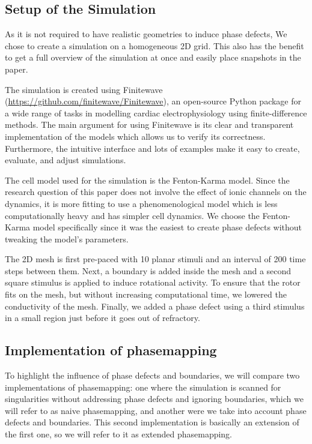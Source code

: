\documentclass[twocolumn]{article}
\begin{document}
\subsection{Setup of the Simulation}\label{setup-of-the-simulation}

As it is not required to have realistic geometries to induce phase
defects, We chose to create a simulation on a homogeneous 2D grid. This
also has the benefit to get a full overview of the simulation at once
and easily place snapshots in the paper.

The simulation is created using Finitewave
(\url{https://github.com/finitewave/Finitewave}), an open-source Python
package for a wide range of tasks in modelling cardiac electrophysiology
using finite-difference methods. The main argument for using Finitewave
is its clear and transparent implementation of the models which allows
us to verify its correctness. Furthermore, the intuitive interface and
lots of examples make it easy to create, evaluate, and adjust
simulations.

The cell model used for the simulation is the Fenton-Karma model. Since
the research question of this paper does not involve the effect of ionic
channels on the dynamics, it is more fitting to use a phenomenological
model which is less computationally heavy and has simpler cell dynamics.
We choose the Fenton-Karma model specifically since it was the easiest
to create phase defects without tweaking the model's parameters.

The 2D mesh is first pre-paced with 10 planar stimuli and an interval of
200 time steps between them. Next, a boundary is added inside the mesh
and a second square stimulus is applied to induce rotational activity.
To ensure that the rotor fits on the mesh, but without increasing
computational time, we lowered the conductivity of the mesh. Finally, we
added a phase defect using a third stimulus in a small region just
before it goes out of refractory.

\subsection{Implementation of
phasemapping}\label{implementation-of-phasemapping}

To highlight the influence of phase defects and boundaries, we will
compare two implementations of phasemapping: one where the simulation is
scanned for singularities without addressing phase defects and ignoring
boundaries, which we will refer to as naive phasemapping, and another
were we take into account phase defects and boundaries. This second
implementation is basically an extension of the first one, so we will
refer to it as extended phasemapping.
\end{document}
